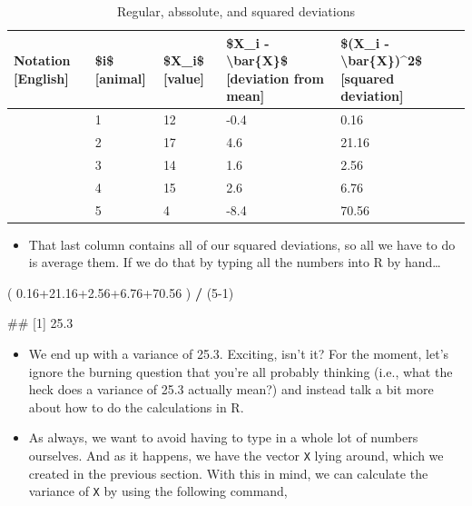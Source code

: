 \documentclass[
]{book}
\newenvironment{Shaded}{\begin{snugshade}}{\end{snugshade}}
\newcommand{\DecValTok}[1]{\textcolor[rgb]{0.00,0.00,0.81}{#1}}
\newcommand{\FloatTok}[1]{\textcolor[rgb]{0.00,0.00,0.81}{#1}}
\newcommand{\NormalTok}[1]{#1}
\newcommand{\SpecialCharTok}[1]{\textcolor[rgb]{0.81,0.36,0.00}{\textbf{#1}}}
\providecommand{\tightlist}{%
  \setlength{\itemsep}{0pt}\setlength{\parskip}{0pt}}
\begin{document}
\begin{table}

\caption{\label{tab:unnamed-chunk-182}Regular, abssolute, and squared deviations}
\centering
\begin{tabular}[t]{lllll}
\toprule
Notation [English] & \$i\$ [animal] & \$X\_i\$ [value] & \$X\_i - \textbackslash{}bar\{X\}\$ [deviation from mean] & \$(X\_i - \textbackslash{}bar\{X\})\textasciicircum{}2\$ [squared deviation]\\
\midrule
 & 1 & 12 & -0.4 & 0.16\\
 & 2 & 17 & 4.6 & 21.16\\
 & 3 & 14 & 1.6 & 2.56\\
 & 4 & 15 & 2.6 & 6.76\\
 & 5 & 4 & -8.4 & 70.56\\
\bottomrule
\end{tabular}
\end{table}

\begin{itemize}
\tightlist
\item
  That last column contains all of our squared deviations, so all we have to do is average them. If we do that by typing all the numbers into R by hand\ldots{}
\end{itemize}

\begin{Shaded}
\begin{Highlighting}[]
\NormalTok{( }\FloatTok{0.16+21.16+2.56+6.76+70.56}\NormalTok{ ) }\SpecialCharTok{/}\NormalTok{ (}\DecValTok{5{-}1}\NormalTok{)}
\end{Highlighting}
\end{Shaded}

\begin{Shaded}
\begin{Highlighting}[]
\NormalTok{\#\# [1] 25.3}
\end{Highlighting}
\end{Shaded}

\begin{itemize}
\item
  We end up with a variance of 25.3. Exciting, isn't it? For the moment, let's ignore the burning question that you're all probably thinking (i.e., what the heck does a variance of 25.3 actually mean?) and instead talk a bit more about how to do the calculations in R.
\item
  As always, we want to avoid having to type in a whole lot of numbers ourselves. And as it happens, we have the vector \texttt{X} lying around, which we created in the previous section. With this in mind, we can calculate the variance of \texttt{X} by using the following command,
\end{itemize}
\end{document}
